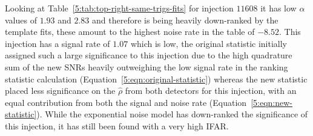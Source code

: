 Looking at Table~\ref{5:tab:top-right-same-trigs-fits} for injection $11608$ it has low $\alpha$ values of $1.93$ and $2.83$ and therefore is being heavily down-ranked by the template fits, these amount to the highest noise rate in the table of $-8.52$. This injection has a signal rate of $1.07$ which is low, the original statistic initially assigned such a large significance to this injection due to the high quadrature sum of the new SNRs heavily outweighing the low signal rate in the ranking statistic calculation (Equation~\ref{5:eqn:original-statistic}) whereas the new statistic placed less significance on the $\hat{\rho}$ from both detectors for this injection, with an equal contribution from both the signal and noise rate (Equation~\ref{5:eqn:new-statistic}). While the exponential noise model has down-ranked the significance of this injection, it has still been found with a very high IFAR.


